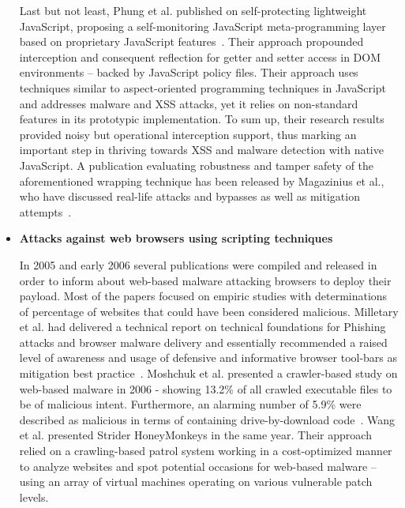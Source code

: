 \begin{itemize}
     Last but not least, Phung et al. published on self-protecting lightweight JavaScript, proposing a self-monitoring JavaScript meta-programming layer based on proprietary JavaScript features~\cite{phung_lightweight_2009}. Their approach propounded interception and consequent reflection for getter and setter access in DOM environments -- backed by JavaScript policy files. Their approach uses techniques similar to aspect-oriented programming techniques in JavaScript and addresses malware and XSS attacks, yet it relies on non-standard features in its prototypic implementation. To sum up, their research results provided noisy but operational interception support, thus marking an important step in thriving towards XSS and malware detection with native JavaScript. A publication evaluating robustness and tamper safety of the aforementioned wrapping technique has been released by Magazinius et al., who have discussed real-life attacks and bypasses as well as mitigation attempts~\cite{magazinius_safe_2010}. \\

    \item \textbf{Attacks against web browsers using scripting techniques} 

      In 2005 and early 2006 several publications were compiled and released in order to inform about web-based malware attacking browsers to deploy their payload. Most of the papers focused on empiric studies with determinations of percentage of websites that could have been considered malicious. Milletary et al. had delivered a technical report on technical foundations for Phishing attacks and browser malware delivery and essentially recommended a raised level of awareness and usage of defensive and informative browser tool-bars as mitigation best practice~\cite{milletary2005technical}. Moshchuk et al. presented a crawler-based study on web-based malware in 2006 - showing 13.2\% of all crawled executable files to be of malicious intent. Furthermore, an alarming number of 5.9\% were described as malicious in terms of containing drive-by-download code~\cite{moshchuk2006crawler}. Wang et al. presented Strider HoneyMonkeys in the same year. Their approach relied on a crawling-based patrol system working in a cost-optimized manner to analyze websites and spot potential occasions for web-based malware -- using an array of virtual machines operating on various vulnerable patch levels. \\


\end{itemize}
